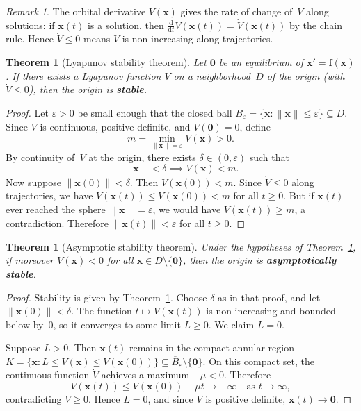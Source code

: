 \documentclass[12pt,a4paper,openany]{book}
\theoremstyle{definition}
\theoremstyle{plain}
\newtheorem{theorem}[definition]{Theorem}
\theoremstyle{remark}
\newtheorem{remark}[definition]{Remark}
\newcommand{\dd}{\mathrm{d}}
\newcommand{\norm}[1]{\left\|#1\right\|}
\begin{document}
\begin{remark}
\label{rem:orbital-deriv}
The orbital derivative \(\dot{V}(\mathbf{x})\) gives the rate of change of~\(V\)
along solutions: if \(\mathbf{x}(t)\) is a solution, then
\(\frac{\dd}{\dd t}V(\mathbf{x}(t))=\dot{V}(\mathbf{x}(t))\) by the chain rule.
Hence \(\dot{V}\le 0\) means \(V\) is non-increasing along trajectories.
\end{remark}

\begin{theorem}[Lyapunov stability theorem]
\label{thm:lyapunov-stability}
Let \(\mathbf{0}\) be an equilibrium of \(\mathbf{x}'=\mathbf{f}(\mathbf{x})\).
If there exists a Lyapunov function \(V\) on a neighborhood~\(D\) of the
origin (with \(\dot{V}\le 0\)), then the origin is \textbf{stable}.
\end{theorem}

\begin{proof}
Let \(\varepsilon>0\) be small enough that the closed ball
\(\overline{B}_\varepsilon=\{\mathbf{x}:\norm{\mathbf{x}}\le\varepsilon\}\subseteq D\).
Since \(V\) is continuous, positive definite, and \(V(\mathbf{0})=0\), define
\[
  m = \min_{\norm{\mathbf{x}}=\varepsilon} V(\mathbf{x}) > 0.
\]
By continuity of~\(V\) at the origin, there exists \(\delta\in(0,\varepsilon)\)
such that
\[
  \norm{\mathbf{x}}<\delta \implies V(\mathbf{x}) < m.
\]
Now suppose \(\norm{\mathbf{x}(0)}<\delta\). Then \(V(\mathbf{x}(0))<m\).
Since \(\dot{V}\le 0\) along trajectories, we have
\(V(\mathbf{x}(t))\le V(\mathbf{x}(0))<m\) for all \(t\ge 0\). But if
\(\mathbf{x}(t)\) ever reached the sphere \(\norm{\mathbf{x}}=\varepsilon\),
we would have \(V(\mathbf{x}(t))\ge m\), a contradiction. Therefore
\(\norm{\mathbf{x}(t)}<\varepsilon\) for all \(t\ge 0\).
\end{proof}

\begin{theorem}[Asymptotic stability theorem]
\label{thm:lyapunov-asymptotic}
Under the hypotheses of Theorem~\ref{thm:lyapunov-stability}, if moreover
\(\dot{V}(\mathbf{x})<0\) for all \(\mathbf{x}\in D\setminus\{\mathbf{0}\}\),
then the origin is \textbf{asymptotically stable}.
\end{theorem}

\begin{proof}
Stability is given by Theorem~\ref{thm:lyapunov-stability}. Choose \(\delta\)
as in that proof, and let \(\norm{\mathbf{x}(0)}<\delta\). The function
\(t\mapsto V(\mathbf{x}(t))\) is non-increasing and bounded below by~\(0\),
so it converges to some limit \(L\ge 0\). We claim \(L=0\).

Suppose \(L>0\). Then \(\mathbf{x}(t)\) remains in the compact annular region
\(K=\{\mathbf{x}: L\le V(\mathbf{x})\le V(\mathbf{x}(0))\}\subseteq
\overline{B}_\varepsilon\setminus\{\mathbf{0}\}\). On this compact set, the
continuous function \(\dot{V}\) achieves a maximum \(-\mu<0\). Therefore
\[
  V(\mathbf{x}(t)) \le V(\mathbf{x}(0)) - \mu t \to -\infty
  \quad\text{as } t\to\infty,
\]
contradicting \(V\ge 0\). Hence \(L=0\), and since \(V\) is positive definite,
\(\mathbf{x}(t)\to\mathbf{0}\).
\end{proof}
\end{document}
